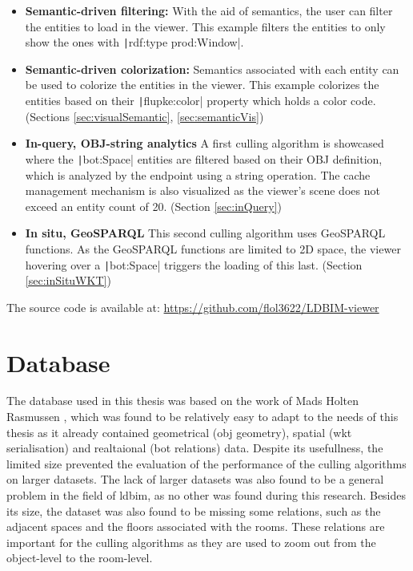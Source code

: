 \begin{itemize}
    \item \textbf{Semantic-driven filtering:} With the aid of semantics, the user can filter the entities to load in the viewer. This example filters the entities to only show the ones with \texttt|rdf:type prod:Window|.
    \item \textbf{Semantic-driven colorization:} Semantics associated with each entity can be used to colorize the entities in the viewer. This example colorizes the entities based on their \texttt|flupke:color| property which holds a color code. (Sections \ref{sec:visualSemantic}, \ref{sec:semanticVis})
    \item \textbf{In-query, OBJ-string analytics} A first culling algorithm is showcased where the \texttt|bot:Space| entities are filtered based on their OBJ definition, which is analyzed by the endpoint using a string operation. The cache management mechanism is also visualized as the viewer's scene does not exceed an entity count of 20. (Section \ref{sec:inQuery})
    \item \textbf{In situ, GeoSPARQL} This second culling algorithm uses GeoSPARQL functions. As the GeoSPARQL functions are limited to 2D space, the viewer hovering over a \texttt|bot:Space| triggers the loading of this last. (Section \ref{sec:inSituWKT})
\end{itemize}

The source code is available at: \url{https://github.com/flol3622/LDBIM-viewer}


\section{Database}

The database used in this thesis was based on the work of Mads Holten Rasmussen \cite{}, which was found to be relatively easy to adapt to the needs of this thesis as it already contained geometrical (obj geometry), spatial (\ac{wkt} serialisation) and realtaional (\ac{bot} relations) data. Despite its usefullness, the limited size prevented the evaluation of the performance of the culling algorithms on larger datasets. The lack of larger datasets was also found to be a general problem in the field of \ac{ldbim}, as no other was found during this research. Besides its size, the dataset was also found to be missing some relations, such as the adjacent spaces and the floors associated with the rooms. These relations are important for the culling algorithms as they are used to zoom out from the object-level to the room-level.

